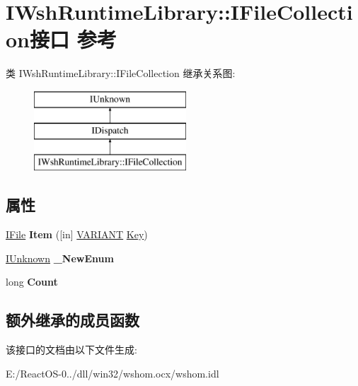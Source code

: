\hypertarget{interface_i_wsh_runtime_library_1_1_i_file_collection}{}\section{I\+Wsh\+Runtime\+Library\+:\+:I\+File\+Collection接口 参考}
\label{interface_i_wsh_runtime_library_1_1_i_file_collection}
类 I\+Wsh\+Runtime\+Library\+:\+:I\+File\+Collection 继承关系图\+:\begin{figure}[H]
\begin{center}
\leavevmode
\includegraphics[height=3.000000cm]{interface_i_wsh_runtime_library_1_1_i_file_collection}
\end{center}
\end{figure}
\subsection*{属性}
\begin{DoxyCompactItemize}
\item 
\mbox{\label{interface_i_wsh_runtime_library_1_1_i_file_collection_a03525fffda0935fe56ed3c59b61cac52}} 
\hyperlink{interface_i_wsh_runtime_library_1_1_i_file}{I\+File} {\bfseries Item} (\mbox{[}in\mbox{]} \hyperlink{structtag_v_a_r_i_a_n_t}{V\+A\+R\+I\+A\+NT} \hyperlink{struct_key}{Key})
\item 
\mbox{\label{interface_i_wsh_runtime_library_1_1_i_file_collection_a21f89de565ec253d6bb9e0f4dcda080a}} 
\hyperlink{interface_i_unknown}{I\+Unknown} {\bfseries \+\_\+\+New\+Enum}
\item 
\mbox{\label{interface_i_wsh_runtime_library_1_1_i_file_collection_a326c23391f387a2ee20b0c3ef6db8677}} 
long {\bfseries Count}
\end{DoxyCompactItemize}
\subsection*{额外继承的成员函数}


该接口的文档由以下文件生成\+:\begin{DoxyCompactItemize}
\item 
E\+:/\+React\+O\+S-\/0../dll/win32/wshom.\+ocx/wshom.\+idl\end{DoxyCompactItemize}
